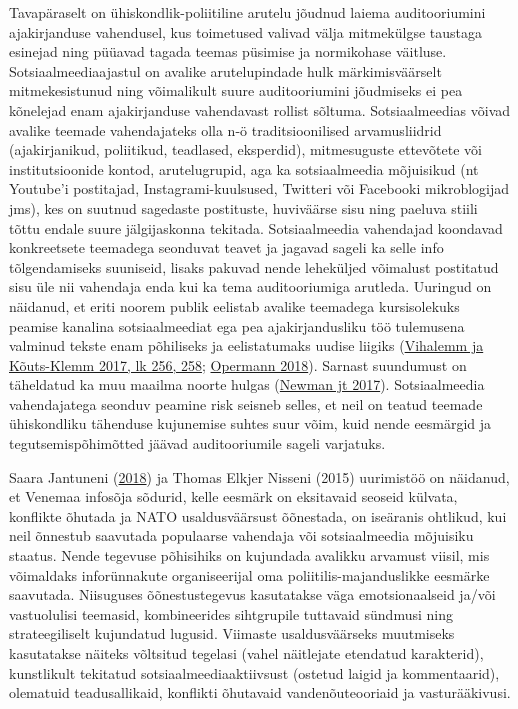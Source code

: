 \documentclass[estonian,]{article}
\begin{document}
Tavapäraselt on ühiskondlik-poliitiline arutelu jõudnud laiema auditooriumini ajakirjanduse vahendusel, kus toimetused valivad välja mitmekülgse taustaga esinejad ning püüavad tagada teemas püsimise ja normikohase väitluse. Sotsiaalmeediaajastul on avalike arutelupindade hulk märkimisväärselt mitmekesistunud ning võimalikult suure auditooriumini jõudmiseks ei pea kõnelejad enam ajakirjanduse vahendavast rollist sõltuma. Sotsiaalmeedias võivad avalike teemade vahendajateks olla n-ö traditsioonilised arvamusliidrid (ajakirjanikud, poliitikud, teadlased, eksperdid), mitmesuguste ettevõtete või institutsioonide kontod, arutelugrupid, aga ka sotsiaalmeedia mõjuisikud (nt Youtube'i postitajad, Instagrami-kuulsused, Twitteri või Facebooki mikroblogijad jms), kes on suutnud sagedaste postituste, huviväärse sisu ning paeluva stiili tõttu endale suure jälgijaskonna tekitada. Sotsiaalmeedia vahendajad koondavad konkreetsete teemadega seonduvat teavet ja jagavad sageli ka selle info tõlgendamiseks suuniseid, lisaks pakuvad nende leheküljed võimalust postitatud sisu üle nii vahendaja enda kui ka tema auditooriumiga arutleda. Uuringud on näidanud, et eriti noorem publik eelistab avalike teemadega kursisolekuks peamise kanalina sotsiaalmeediat ega pea ajakirjandusliku töö tulemusena valminud tekste enam põhiliseks ja eelistatumaks uudise liigiks (\protect\hyperlink{Vihalemm2017}{Vihalemm ja Kõuts-Klemm 2017, lk 256, 258}; \protect\hyperlink{Opermann2018}{Opermann 2018}). Sarnast suundumust on täheldatud ka muu maailma noorte hulgas (\protect\hyperlink{Newman2017}{Newman jt 2017}). Sotsiaalmeedia vahendajatega seonduv peamine risk seisneb selles, et neil on teatud teemade ühiskondliku tähenduse kujunemise suhtes suur võim, kuid nende eesmärgid ja tegutsemispõhimõtted jäävad auditooriumile sageli varjatuks.

Saara Jantuneni (\protect\hyperlink{Jantunen2018}{2018}) ja Thomas Elkjer Nisseni (2015) uurimistöö on näidanud, et Venemaa infosõja sõdurid, kelle eesmärk on eksitavaid seoseid külvata, konflikte õhutada ja NATO usaldusväärsust õõnestada, on iseäranis ohtlikud, kui neil õnnestub saavutada populaarse vahendaja või sotsiaalmeedia mõjuisiku staatus. Nende tegevuse põhisihiks on kujundada avalikku arvamust viisil, mis võimaldaks inforünnakute organiseerijal oma poliitilis-majanduslikke eesmärke saavutada. Niisuguses õõnestustegevus kasutatakse väga emotsionaalseid ja/või vastuolulisi teemasid, kombineerides sihtgrupile tuttavaid sündmusi ning strateegiliselt kujundatud lugusid. Viimaste usaldusväärseks muutmiseks kasutatakse näiteks võltsitud tegelasi (vahel näitlejate etendatud karakterid), kunstlikult tekitatud sotsiaalmeediaaktiivsust (ostetud laigid ja kommentaarid), olematuid teadusallikaid, konflikti õhutavaid vandenõuteooriaid ja vasturääkivusi.
\end{document}

